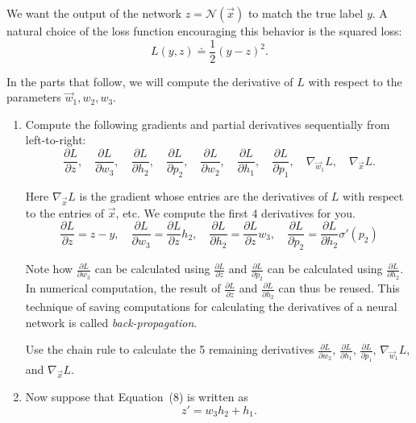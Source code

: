 \documentclass[10pt]{article}
\theoremstyle{definition}
\theoremstyle{plain}
\begin{document}
We want the output of the network $z = \mathcal{N}(\vec{x})$ to match the true label $y$. A natural choice of the loss function encouraging this behavior is the squared loss:
\begin{equation}
L(y, z) \doteq \frac{1}{2}(y - z)^2.
\end{equation}

In the parts that follow, we will compute the derivative of $L$ with respect to the parameters $\vec{w}_1, w_2, w_3$.

\begin{enumerate}[label=(\alph*)]
\item Compute the following gradients and partial derivatives sequentially from left-to-right:
\begin{equation}
\frac{\partial L}{\partial z}, \quad \frac{\partial L}{\partial w_3}, \quad \frac{\partial L}{\partial h_2}, \quad \frac{\partial L}{\partial p_2}, \quad \frac{\partial L}{\partial w_2}, \quad \frac{\partial L}{\partial h_1}, \quad \frac{\partial L}{\partial p_1}, \quad \nabla_{\vec{w}_1} L, \quad \nabla_{\vec{x}} L.
\end{equation}

Here $\nabla_{\vec{x}} L$ is the gradient whose entries are the derivatives of $L$ with respect to the entries of $\vec{x}$, etc. We compute the first 4 derivatives for you.
\begin{equation}
\frac{\partial L}{\partial z} = z - y, \quad \frac{\partial L}{\partial w_3} = \frac{\partial L}{\partial z} h_2, \quad \frac{\partial L}{\partial h_2} = \frac{\partial L}{\partial z} w_3, \quad \frac{\partial L}{\partial p_2} = \frac{\partial L}{\partial h_2} \sigma'(p_2)
\end{equation}

Note how $\frac{\partial L}{\partial w_3}$ can be calculated using $\frac{\partial L}{\partial z}$ and $\frac{\partial L}{\partial p_2}$ can be calculated using $\frac{\partial L}{\partial h_2}$. In numerical computation, the result of $\frac{\partial L}{\partial z}$ and $\frac{\partial L}{\partial h_2}$ can thus be reused. This technique of saving computations for calculating the derivatives of a neural network is called \emph{back-propagation}.

Use the chain rule to calculate the 5 remaining derivatives $\frac{\partial L}{\partial w_2}$, $\frac{\partial L}{\partial h_1}$, $\frac{\partial L}{\partial p_1}$, $\nabla_{\vec{w}_1} L$, and $\nabla_{\vec{x}} L$.

\item Now suppose that Equation~(8) is written as
\begin{equation}
z' = w_3 h_2 + h_1.
\end{equation}


\end{enumerate}
\end{document}
